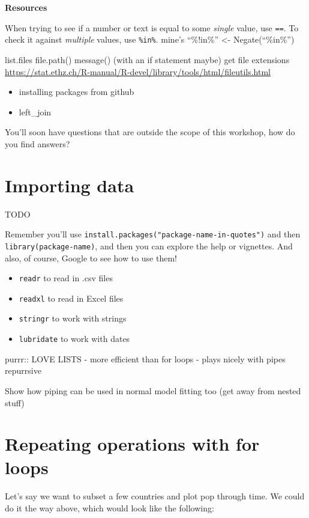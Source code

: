 \documentclass[]{book}
\providecommand{\tightlist}{%
  \setlength{\itemsep}{0pt}\setlength{\parskip}{0pt}}
\theoremstyle{definition}
\theoremstyle{definition}
\theoremstyle{definition}
\theoremstyle{remark}
\begin{document}
\textbf{Resources}

When trying to see if a number or text is equal to some \emph{single}
value, use \texttt{==}. To check it against \emph{multiple} values, use
\texttt{\%in\%}. mine's ``\%!in\%'' \textless{}- Negate(``\%in\%'')

list.files file.path() message() (with an if statement maybe) get file
extensions
\url{https://stat.ethz.ch/R-manual/R-devel/library/tools/html/fileutils.html}

\begin{itemize}
\tightlist
\item
  installing packages from github
\item
  left\_join
\end{itemize}

You'll soon have questions that are outside the scope of this workshop,
how do you find answers?

\section{Importing data}\label{importing-data}

TODO

Remember you'll use \texttt{install.packages("package-name-in-quotes")}
and then \texttt{library(package-name)}, and then you can explore the
help or vignettes. And also, of course, Google to see how to use them!

\begin{itemize}
\tightlist
\item
  \texttt{readr} to read in .csv files
\item
  \texttt{readxl} to read in Excel files
\item
  \texttt{stringr} to work with strings
\item
  \texttt{lubridate} to work with dates
\end{itemize}

purrr:: LOVE LISTS - more efficient than for loops - plays nicely with
pipes repurrsive

Show how piping can be used in normal model fitting too (get away from
nested stuff)

\section{Repeating operations with for
loops}\label{repeating-operations-with-for-loops}

Let's say we want to subset a few countries and plot pop through time.
We could do it the way above, which would look like the following:
\end{document}

